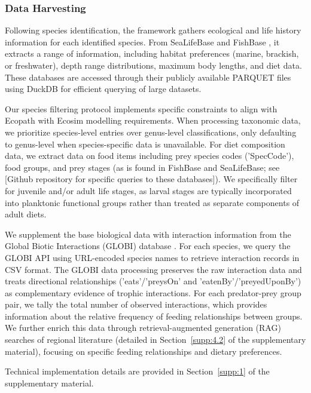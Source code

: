 \subsubsection{Data Harvesting}

Following species identification, the framework gathers ecological and life history information for each identified species. From SeaLifeBase and FishBase \citep{froese2010fishbase}, it extracts a range of information, including habitat preferences (marine, brackish, or freshwater), depth range distributions, maximum body lengths, and diet data. These databases are accessed through their publicly available PARQUET files using DuckDB for efficient querying of large datasets. 

Our species filtering protocol implements specific constraints to align with Ecopath with Ecosim modelling requirements. When processing taxonomic data, we prioritize species-level entries over genus-level classifications, only defaulting to genus-level when species-specific data is unavailable. For diet composition data, we extract data on food items including prey species codes ('SpecCode'), food groups, and prey stages (as is found in FishBase and SeaLifeBase; see [Github repository for specific queries to these databases]). We specifically filter for juvenile and/or adult life stages, as larval stages are typically incorporated into planktonic functional groups rather than treated as separate components of adult diets.

We supplement the base biological data with interaction information from the Global Biotic Interactions (GLOBI) database \citep{Poelen2014}. For each species, we query the GLOBI API using URL-encoded species names to retrieve interaction records in CSV format. The GLOBI data processing preserves the raw interaction data and treats directional relationships ('eats'/'preysOn' and 'eatenBy'/'preyedUponBy') as complementary evidence of trophic interactions. For each predator-prey group pair, we tally the total number of observed interactions, which provides information about the relative frequency of feeding relationships between groups. We further enrich this data through retrieval-augmented generation (RAG) searches of regional literature (detailed in Section~\ref{supp:4.2} of the supplementary material), focusing on specific feeding relationships and dietary preferences.

Technical implementation details are provided in Section~\ref{supp:1} of the supplementary material.
